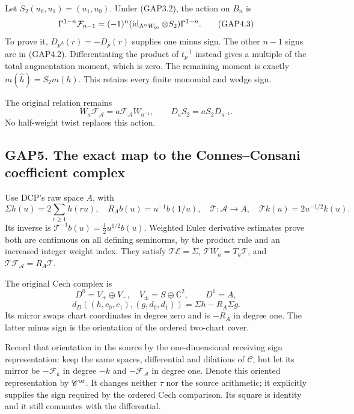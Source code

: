 Let \(S_2(u_0,u_1)=(u_1,u_0)\). Under (GAP3.2), the action on \(B_n\) is
\[
\Gamma^{1-n}\mathcal F_{n-1}
=(-1)^n(\operatorname{id}_{\Lambda^nW_{\rm pr}}\otimes S_2)
\Gamma^{1-n}.
\tag{GAP4.3}
\] To prove it, \(D_p\iota(r)=-D_p(r)\) supplies one minus sign. The
other \(n-1\) signs are in (GAP4.2). Differentiating the product of
\(t_p^{-1}\) instead gives a multiple of the total augmentation moment,
which is zero. The remaining moment is exactly
\(m(\widehat h)=S_2m(h)\). This retains every finite monomial and wedge
sign.

The original relation remains \[
W_a\mathcal F_{\mathcal A}=a\mathcal F_{\mathcal A}W_{a^{-1}},
\qquad D_aS_2=aS_2D_{a^{-1}}.
\tag{GAP4.4}
\] No half-weight twist replaces this action.

\subsection{GAP5. The exact map to the Connes--Consani coefficient
complex}\label{gap5.-the-exact-map-to-the-connesconsani-coefficient-complex}

Use DCP's raw space \(A\), with \[
\Sigma h(u)=2\sum_{r\ge1}h(ru),\quad
R_A b(u)=u^{-1}b(1/u),\quad
\mathcal T:\mathcal A\to A,\quad\mathcal T k(u)=2u^{-1/2}k(u).
\tag{GAP5.1}
\] Its inverse is \(\mathcal T^{-1}b(u)=\tfrac12u^{1/2}b(u)\). Weighted
Euler derivative estimates prove both are continuous on all defining
seminorms, by the product rule and an increased integer weight index.
They satisfy \(\mathcal T\mathcal E=\Sigma\),
\(\mathcal TW_a=T_a\mathcal T\), and
\(\mathcal T\mathcal F_{\mathcal A}=R_A\mathcal T\).

The original Cech complex is \[
D^0=V_+\oplus V_-,\quad V_\pm=S\oplus\mathbb C^2,\qquad D^1=A,
\] \[
d_D((h,c_0,c_1),(g,d_0,d_1))=\Sigma h-R_A\Sigma g.
\tag{GAP5.2}
\] Its mirror swaps chart coordinates in degree zero and is \(-R_A\) in
degree one. The latter minus sign is the orientation of the ordered
two-chart cover.

Record that orientation in the source by the one-dimensional receiving
sign representation: keep the same spaces, differential and dilations of
\(\mathscr C\), but let its mirror be \(-\mathcal F_k\) in degree \(-k\)
and \(-\mathcal F_{\mathcal A}\) in degree one. Denote this oriented
representation by \(\mathscr C^{\rm or}\). It changes neither \(\tau\)
nor the source arithmetic; it explicitly supplies the sign required by
the ordered Cech comparison. Its square is identity and it still
commutes with the differential.

